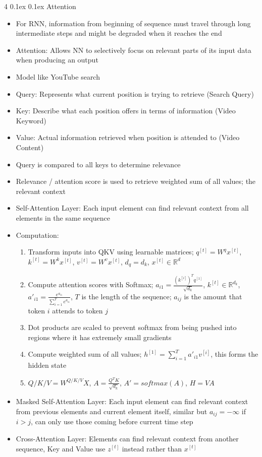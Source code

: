 \documentclass[10pt, landscape]{article}
\makeatletter
\renewcommand{\section}{\@startsection{section}{1}{0mm}%
  {0.1ex} %
  {0.1ex} %
  {\normalfont\large\bfseries}}
\makeatother
\begin{document}
\begin{multicols*}{4}
\section{Attention}
\begin{itemize}
    \item For RNN, information from beginning of sequence must travel through long intermediate steps and might be degraded when it reaches the end
    \item Attention: Allows NN to selectively focus on relevant parts of its input data when producing an output
    \item Model like YouTube search
    \item Query: Represents what current position is trying to retrieve (Search Query)
    \item Key: Describe what each position offers in terms of information (Video Keyword)
    \item Value: Actual information retrieved when position is attended to (Video Content)
    \item Query is compared to all keys to determine relevance
    \item Relevance / attention score is used to retrieve weighted sum of all values; the relevant context
    \item Self-Attention Layer: Each input element can find relevant context from all elements in the same sequence
    \item Computation:
    \begin{enumerate}
        \item Transform inputs into QKV using learnable matrices; $q^{[t]}=W^qx^{[t]}$, $k^{[t]}=W^kx^{[t]}$, $v^{[t]}=W^vx^{[t]}$, $d_q=d_k$, $x^{[t]}\in \mathbb{R}^d$
        \item Compute attention scores with Softmax; $a_{i1}=\frac{(k^{[i]})^Tq^{[1]}}{\sqrt{d_k}}$, $k^{[t]} \in \mathbb{R}^{d_k}$, $a'_{i1}=\frac{e^{a_{i1}}}{\sum_{i=1}^Te^{a_{i1}}}$, $T$ is the length of the sequence; $a_{ij}$ is the amount that token $i$ attends to token $j$
        \item Dot products are scaled to prevent softmax from being pushed into regions where it has extremely small gradients
        \item Compute weighted sum of all values; $h^{[1]}=\sum_{i=1}^Ta'_{i1}v^{[i]}$, this forms the hidden state
        \item $Q/K/V = W^{Q/K/V} X$, $A = \frac{Q^TK}{\sqrt{d_k}}$, $A'=softmax(A)$, $H=VA$
    \end{enumerate}
    \item Masked Self-Attention Layer: Each input element can find relevant context from previous elements and current element itself, similar but $a_{ij}=-\infty$ if $i>j$, can only use those coming before current time step
    \item Cross-Attention Layer: Elements can find relevant context from another sequence, Key and Value use $z^{[t]}$ instead rather than $x^{[t]}$
\end{itemize}


\end{multicols*}
\end{document}

